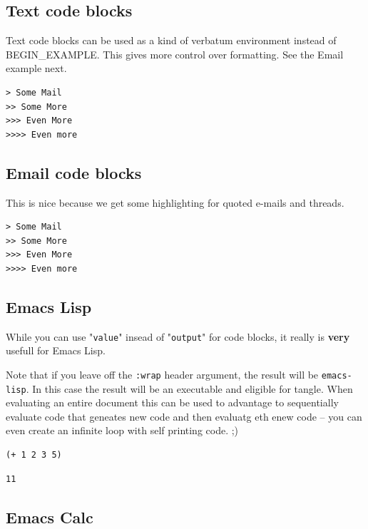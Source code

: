 \documentclass[11pt]{article}
\begin{document}
\subsection{Text code blocks}
\label{sec:org4681237}

Text code blocks can be used as a kind of verbatum environment instead of BEGIN\_EXAMPLE.  This gives more control over formatting.  See the Email example next.

\begin{verbatim}
> Some Mail
>> Some More
>>> Even More
>>>> Even more
\end{verbatim}

\subsection{Email code blocks}
\label{sec:orge76c02c}

This is nice because we get some highlighting for quoted e-mails and threads.

\begin{verbatim}
> Some Mail
>> Some More
>>> Even More
>>>> Even more
\end{verbatim}

\subsection{Emacs Lisp}
\label{sec:orgefa1673}

While you can use "\texttt{value}" insead of "\texttt{output}" for code blocks, it really is \textbf{very} usefull for Emacs Lisp.

Note that if you leave off the \texttt{:wrap} header argument, the result will be \texttt{emacs-lisp}.  In this case the result will be an executable and eligible for
tangle.  When evaluating an entire document this can be used to advantage to sequentially evaluate code that geneates new code and then evaluatg eth enew code
-- you can even create an infinite loop with self printing code. ;)

\begin{verbatim}
(+ 1 2 3 5)
\end{verbatim}

\begin{verbatim}
11
\end{verbatim}

\subsection{Emacs Calc}
\label{sec:orga841769}
\end{document}
